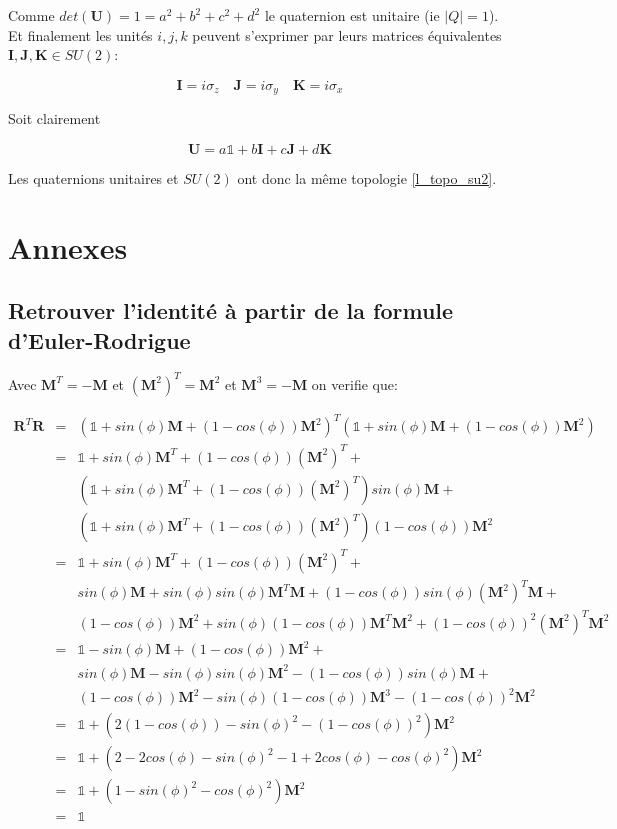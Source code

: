 \documentclass[12pt,a4paper]{article}
\newcommand{\unit}
{
\bm{\mathds{1}}
}
\begin{document}
Comme $det(\bm{U})=1=a^2+b^2+c^2+d^2$ le quaternion est unitaire (ie $|Q|=1$). Et finalement les unités $i,j,k$ peuvent s'exprimer par leurs matrices équivalentes $\bm{I},\bm{J},\bm{K} \in SU(2)$:

\[
	\boxed{\bm{I}=i\sigma_z \quad \bm{J}=i\sigma_y \quad \bm{K}=i\sigma_x}
\]  

Soit clairement

\[
	\boxed{\bm{U}=a\mathds{1}+b\bm{I}+c\bm{J}+d\bm{K}}
\]

Les quaternions unitaires et $SU(2)$ ont donc la même topologie \ref{l_topo_su2}.

\newpage
\section{Annexes}
\subsection{Retrouver l'identité à partir de la formule d'Euler-Rodrigue}
Avec $\bm{M}^T=-\bm{M}$ et $(\bm{M}^2)^T=\bm{M}^2$ et $\bm{M}^3=-\bm{M}$ on verifie que:

\begin{eqnarray*}
	\bm{R}^T \bm{R}&=&(\unit+sin(\phi)\bm{M}+(1-cos(\phi))\bm{M}^2)^T (\unit+sin(\phi)\bm{M}+(1-cos(\phi))\bm{M}^2)\\
	&=&\unit+sin(\phi)\bm{M}^T+(1-cos(\phi))(\bm{M}^2)^T+\\
	&&(\unit+sin(\phi)\bm{M}^T+(1-cos(\phi))(\bm{M}^2)^T)sin(\phi)\bm{M}+\\
	&&(\unit+sin(\phi)\bm{M}^T+(1-cos(\phi))(\bm{M}^2)^T)(1-cos(\phi))\bm{M}^2\\
	&=&\unit+sin(\phi)\bm{M}^T+(1-cos(\phi))(\bm{M}^2)^T+\\
	&&sin(\phi)\bm{M}+sin(\phi)sin(\phi)\bm{M}^T\bm{M}+(1-cos(\phi))sin(\phi)(\bm{M}^2)^T\bm{M}+\\
	&&(1-cos(\phi))\bm{M}^2+sin(\phi)(1-cos(\phi))\bm{M}^T\bm{M}^2+(1-cos(\phi))^2(\bm{M}^2)^T\bm{M}^2\\
	&=&\unit-sin(\phi)\bm{M}+(1-cos(\phi))\bm{M}^2+\\
	&&sin(\phi)\bm{M}-sin(\phi)sin(\phi)\bm{M}^2-(1-cos(\phi))sin(\phi)\bm{M}+\\
	&&(1-cos(\phi))\bm{M}^2-sin(\phi)(1-cos(\phi))\bm{M}^3-(1-cos(\phi))^2\bm{M}^2\\
	&=&\unit+(2(1-cos(\phi))-sin(\phi)^2-(1-cos(\phi))^2)\bm{M}^2\\
	&=&\unit+(2-2cos(\phi)-sin(\phi)^2-1+2cos(\phi)-cos(\phi)^2)\bm{M}^2\\
	&=&\unit+(1-sin(\phi)^2-cos(\phi)^2)\bm{M}^2\\
	&=&\unit\\	
\end{eqnarray*}
\end{document}
